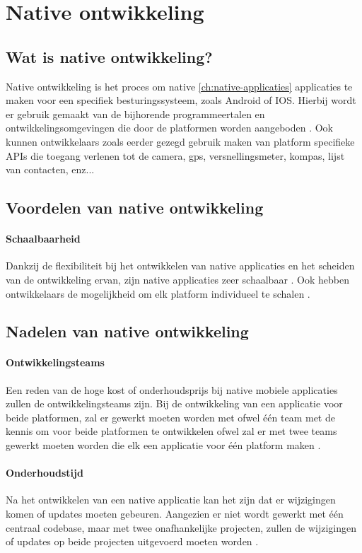 \section{Native ontwikkeling}
\subsection{Wat is native ontwikkeling?}\label{subsec:wat-is-native-ontwikkeling}
Native ontwikkeling is het proces om native \ref{ch:native-applicaties} applicaties te maken 
voor een specifiek besturingssysteem, zoals Android of IOS. Hierbij wordt er gebruik gemaakt van de 
bijhorende programmeertalen en ontwikkelingsomgevingen die door de platformen worden aangeboden 
\autocite{Meirelles2019}. Ook kunnen ontwikkelaars zoals eerder gezegd gebruik maken van 
platform specifieke APIs die toegang verlenen tot de camera, gps, versnellingsmeter, kompas, 
lijst van contacten, enz...

\subsection{Voordelen van native ontwikkeling}
\paragraph{Schaalbaarheid}
Dankzij de flexibiliteit bij het ontwikkelen van native applicaties en het scheiden van 
de ontwikkeling ervan, zijn native applicaties zeer schaalbaar \autocite{Koffer2023}. 
Ook hebben ontwikkelaars de mogelijkheid om elk platform individueel te schalen \autocite{Sakovich2023}. 

\subsection{Nadelen van native ontwikkeling}
\paragraph{Ontwikkelingsteams}
Een reden van de hoge kost of onderhoudsprijs bij native mobiele applicaties 
zullen de ontwikkelingsteams zijn. Bij de ontwikkeling van een applicatie voor beide 
platformen, zal er gewerkt moeten worden met ofwel één team met de kennis om voor beide 
platformen te ontwikkelen ofwel zal er met twee teams gewerkt moeten worden die elk een applicatie 
voor één platform maken \autocite{Kotlin2023}.

\paragraph{Onderhoudstijd}
Na het ontwikkelen van een native applicatie kan het zijn dat er wijzigingen komen of 
updates moeten gebeuren. Aangezien er niet wordt gewerkt met één centraal codebase, maar 
met twee onafhankelijke projecten, zullen de wijzigingen of updates op beide projecten 
uitgevoerd moeten worden \autocite{Kotlin2023}.


